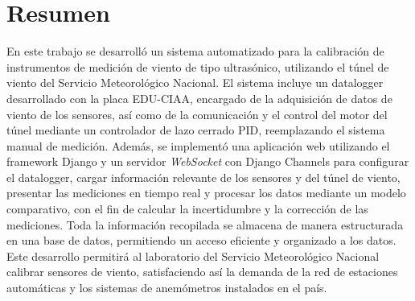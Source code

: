 \chapter*{Resumen}
En este trabajo se desarrolló un sistema automatizado para la calibración de instrumentos de medición de viento de tipo ultrasónico, utilizando el túnel de viento del Servicio Meteorológico Nacional. El sistema incluye un datalogger desarrollado con la placa EDU-CIAA, encargado de la adquisición de datos de viento de los sensores, así como de la comunicación y el control del motor del túnel mediante un controlador de lazo cerrado PID, reemplazando el sistema manual de medición. Además, se implementó una aplicación web utilizando el framework Django y un servidor \textit{WebSocket} con Django Channels para configurar el datalogger, cargar información relevante de los sensores y del túnel de viento, presentar las mediciones en tiempo real y procesar los datos mediante un modelo comparativo, con el fin de calcular la incertidumbre y la corrección de las mediciones. Toda la información recopilada se almacena de manera estructurada en una base de datos, permitiendo un acceso eficiente y organizado a los datos. Este desarrollo permitirá al laboratorio del Servicio Meteorológico Nacional calibrar sensores de viento, satisfaciendo así la demanda de la red de estaciones automáticas y los sistemas de anemómetros instalados en el país.

